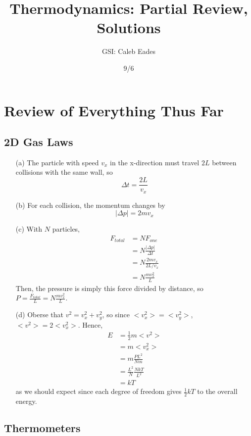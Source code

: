 \documentclass{article}
\begin{document}
	
\title{Thermodynamics: Partial Review, Solutions}
\author{GSI: Caleb Eades}
\date{9/6}
\maketitle

\section{Review of Everything Thus Far}

\subsection{2D Gas Laws}

\begin{itemize}
	\item[(a)] The particle with speed $v_x$ in the x-direction must travel $2L$ between collisions with the same wall, so
	\begin{equation}
	\Delta t = \frac{2L}{v_x}
	\end{equation}
	\item[(b)] For each collision, the momentum changes by
	\begin{equation}
	|\Delta p| = 2mv_x
	\end{equation}
	\item[(c)] With $N$ particles,
	\begin{align*}
	F_{total} &= NF_{one} \\
	&= N\frac{|\Delta p|}{\Delta t} \\
	&= N\frac{2mv_x}{2L/v_x} \\
	&= N\frac{mv_x^2}{L}
	\end{align*}
	Then, the pressure is simply this force divided by distance, so $P = \frac{F_{total}}{L} = N\frac{mv_x^2}{L}$.
	\item[(d)] Oberse that $v^2 = v_x^2 + v_y^2$, so since $<v_x^2> = <v_y^2>$, $<v^2> = 2<v_x^2>$. Hence,
	\begin{align*}
	E &= \frac{1}{2}m<v^2> \\
	&= m<v_x^2> \\
	&= m\frac{PL^2}{Nm} \\
	&= \frac{L^2}{N}\frac{NkT}{L^2} \\
	&= kT
	\end{align*}
	as we should expect since each degree of freedom gives $\frac{1}{2}kT$ to the overall energy.
\end{itemize}

\subsection{Thermometers}
\end{document}
